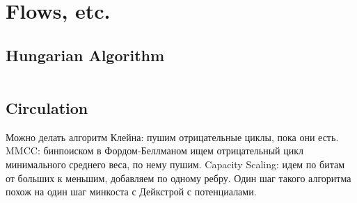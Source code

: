 \section{Flows, etc.}

\subsection{Hungarian Algorithm}

\inputminted{cpp}{\code/hungarian.cpp}

\subsection{Circulation}

Можно делать алгоритм Клейна: пушим отрицательные циклы, пока они есть. MMCC: бинпоиском в Фордом-Беллманом ищем отрицательный цикл минимального среднего веса, по нему пушим. Capacity Scaling: идем по битам от больших к меньшим, добавляем по одному ребру. Один шаг такого алгоритма похож на один шаг минкоста с Дейкстрой с потенциалами.
